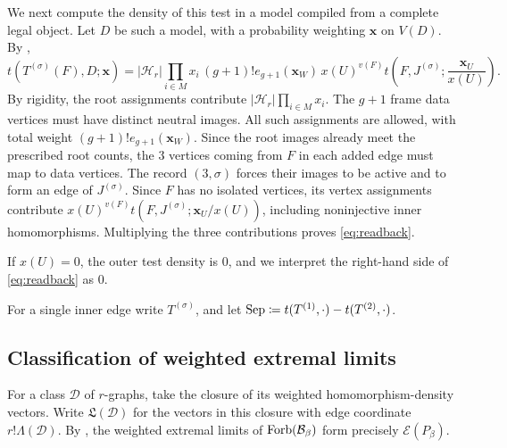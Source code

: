 \documentclass[10pt]{article}
\numberwithin{equation}{section}
\theoremstyle{definition}
\newcommand{\cD}{\mathcal D}\newcommand{\cE}{\mathcal E}\newcommand{\cF}{\mathcal F}
\newcommand{\Forb}{\operatorname{Forb}}\newcommand{\Ext}{\operatorname{Ext}}
\newcommand{\x}{\boldsymbol{x}}\newcommand{\y}{\boldsymbol{y}}
\begin{document}
We next compute the density of this test in a model compiled from a complete legal object. Let $D$ be such a model, with a probability weighting $\x$ on $V(D)$. By ,
\begin{equation}\label{eq:readback}
 t(T^{(\sigma)}(F),D;\x)=|\mathscr H_r|\!\prod_{i\in M}x_i\,
       (g+1)!e_{g+1}(\x_W)\,x(U)^{v(F)}
       t\left(F,J^{(\sigma)};\frac{\x_U}{x(U)}\right).
\end{equation}
By rigidity, the root assignments contribute $|\mathscr H_r|\prod_{i\in M}x_i$. The $g+1$ frame data vertices must have distinct neutral images. All such assignments are allowed, with total weight $(g+1)!e_{g+1}(\x_W)$. Since the root images already meet the prescribed root counts, the $3$ vertices coming from $F$ in each added edge must map to data vertices. The record $(3,\sigma)$ forces their images to be active and to form an edge of $J^{(\sigma)}$. Since $F$ has no isolated vertices, its vertex assignments contribute $x(U)^{v(F)}t(F,J^{(\sigma)};\x_U/x(U))$, including noninjective inner homomorphisms. Multiplying the three contributions proves \eqref{eq:readback}.

If $x(U)=0$, the outer test density is $0$, and we interpret the right-hand side of \eqref{eq:readback} as $0$.

For a single inner edge write $T^{(\sigma)}$, and let $\operatorname{Sep}\coloneqq t(T^{(1)},\cdot)-t(T^{(2)},\cdot)$.

\subsection{Classification of weighted extremal limits}
For a class $\cD$ of $r$-graphs, take the closure of its weighted homomorphism-density vectors. Write $\mathfrak L(\cD)$ for the vectors in this closure with edge coordinate $r!\Lambda(\cD)$. By , the weighted extremal limits of $\Forb(\cB_\beta)$ form precisely $\cE(P_\beta)$.
\end{document}
